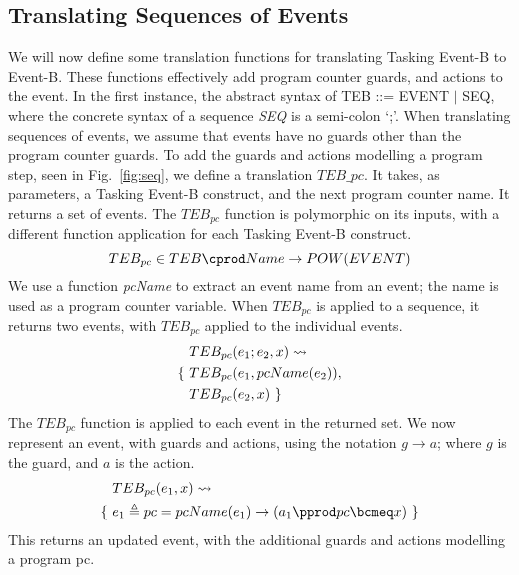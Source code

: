 \subsection{Translating Sequences of Events}
We will now define some translation functions for translating Tasking Event-B to Event-B. These functions effectively add program counter guards, and actions to the event. In the first instance, the abstract syntax of TEB ::= EVENT $|$ SEQ, where the concrete syntax of a sequence \emph{SEQ} is a semi-colon `;'. When translating sequences of events, we assume that events have no guards other than the program counter guards. To add the guards and actions modelling a program step, seen in Fig.~\ref{fig:seq}, we define a translation $TEB\_{pc}$. It takes, as parameters, a Tasking Event-B construct, and the next program counter name. It returns a set of events. The $TEB_{pc}$ function is polymorphic on its inputs, with a different function application for each Tasking Event-B construct.
%
\begin{equation}
TEB_{pc} \in  TEB \cprod Name \rightarrow POW(EVENT)
\notag
\end{equation}
%
We use a function \emph{pcName} to extract an event name from an event; the name is used as a program counter variable. When $TEB_{pc}$ is applied to a sequence, it returns two events, with $TEB_{pc}$ applied to the individual events. 
%
\begin{equation}
\begin{split}
&TEB_{pc}(e_1 ; e_2, x) \leadsto \\
\{~&TEB_{pc}(e_1, pcName(e_2)),\\
&TEB_{pc}(e_2, x)~\}
\end{split}
\notag
\end{equation}
%
The $TEB_{pc}$ function is applied to each event in the returned set. We now represent an event, with guards and actions, using the notation $g \rightarrow a$; where $g$ is the guard, and $a$ is the action. 
\begin{equation}
\begin{split}
&TEB_{pc}(e_1, x) \leadsto \\
\{~&e_1 \triangleq pc = pcName(e_1) \rightarrow ( a_1 \pprod pc \bcmeq x )~\}
\end{split}
\notag
\end{equation}
This returns an updated event, with the additional guards and actions modelling a program pc.

